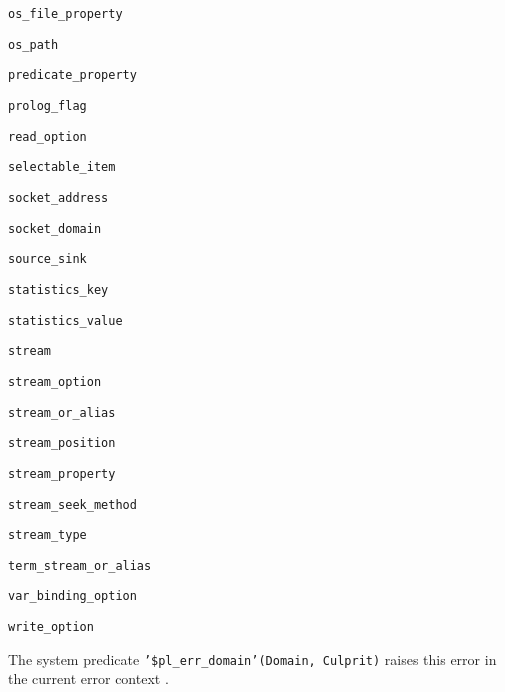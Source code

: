 \begin{ItemizeThreeCols}
\item \texttt{os\_file\_property}

\item \texttt{os\_path}

\item \texttt{predicate\_property}

\item \texttt{prolog\_flag}

\item \texttt{read\_option}

\item \texttt{selectable\_item}

\item \texttt{socket\_address}

\item \texttt{socket\_domain}

\item \texttt{source\_sink}

\item \texttt{statistics\_key}

\item \texttt{statistics\_value}

\item \texttt{stream}

\item \texttt{stream\_option}

\item \texttt{stream\_or\_alias}

\item \texttt{stream\_position}

\item \texttt{stream\_property}

\item \texttt{stream\_seek\_method}

\item \texttt{stream\_type}

\item \texttt{term\_stream\_or\_alias}

\item \texttt{var\_binding\_option}

\item \texttt{write\_option}

\end{ItemizeThreeCols}

The system predicate \texttt{'\$pl\_err\_domain'(Domain, Culprit)} raises
this error in the current error context .

